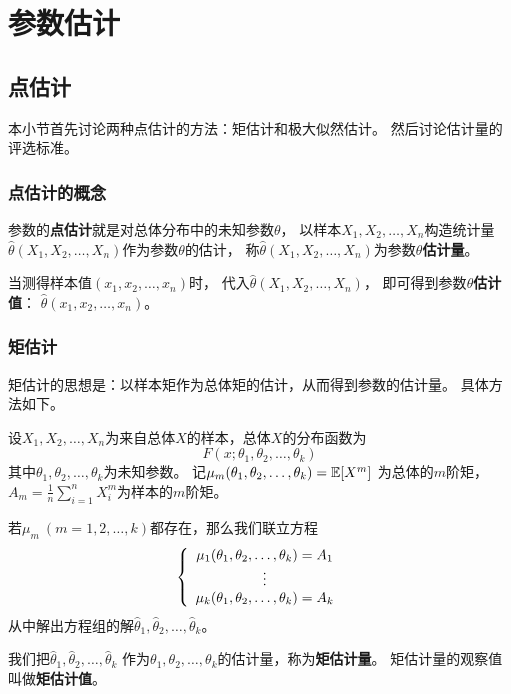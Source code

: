 \chapter{参数估计}

\section{点估计}
本小节首先讨论两种点估计的方法：矩估计和极大似然估计。
然后讨论估计量的评选标准。

\subsection{点估计的概念}
参数的\textbf{点估计}就是对总体分布中的未知参数$\theta$，
以样本$X_1,X_2,\dots,X_n$构造统计量
$\hat{\theta}(X_1,X_2,\dots,X_n)$作为参数$\theta$的估计，
称$\hat{\theta}(X_1,X_2,\dots,X_n)$为参数$\theta$\textbf{估计量}。

当测得样本值$(x_1,x_2,\dots,x_n)$时，
代入$\hat{\theta}(X_1,X_2,\dots,X_n)$，
即可得到参数$\theta$\textbf{估计值}：
$\hat{\theta}(x_1,x_2,\dots,x_n)$。

\subsection{矩估计}
矩估计的思想是：以样本矩作为总体矩的估计，从而得到参数的估计量。
具体方法如下。

设$X_1,X_2,\dots,X_n$为来自总体$X$的样本，总体$X$的分布函数为
\begin{displaymath}
  F(x;\theta_1,\theta_2,\dots,\theta_k)
\end{displaymath}
其中$\theta_1,\theta_2,\dots,\theta_k$为未知参数。
记$\mu_m(\theta_1,\theta_2,\dots,\theta_k)=\mexpect[X^m]$
为总体的$m$阶矩，
$A_m=\frac{1}{n}\sum_{i=1}^{n}X_i^m$为样本的$m$阶矩。

若$\mu_m\ (m=1,2,\dots,k)$都存在，那么我们联立方程
\begin{displaymath}
  \meqs{c}{
    \mu_1(\theta_1,\theta_2,\dots,\theta_k) = A_1 \\
    \vdots \\
    \mu_k(\theta_1,\theta_2,\dots,\theta_k) = A_k
  }
\end{displaymath}
从中解出方程组的解$\hat{\theta}_1,\hat{\theta}_2,\dots,\hat{\theta}_k$。

我们把$\hat{\theta}_1,\hat{\theta}_2,\dots,\hat{\theta}_k$
作为$\theta_1,\theta_2,\dots,\theta_k$的估计量，称为\textbf{矩估计量}。
矩估计量的观察值叫做\textbf{矩估计值}。

